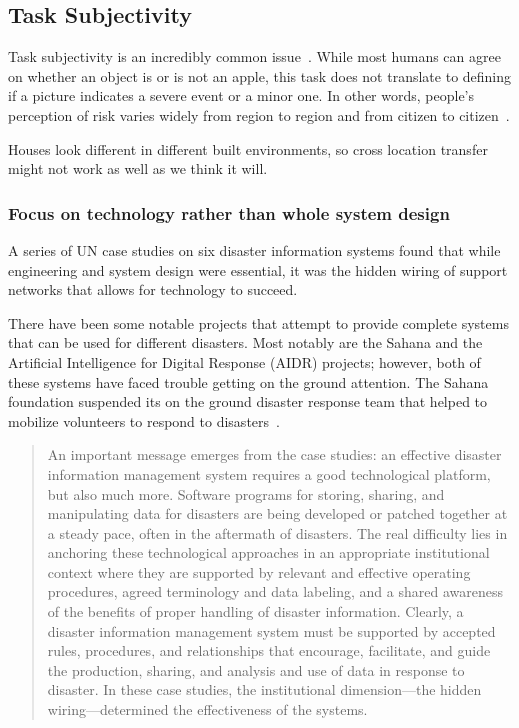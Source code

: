 \subsection{Task Subjectivity}
Task subjectivity is an incredibly common
issue~\cite{nguyenDamageAssessmentSocial2017,
quarantelliUrbanVulnerabilityDisasters2003}. While most humans can agree on
whether an object is or is not an apple, this task does not translate to
defining if a picture indicates a severe event or a minor one. 
In other words, people's perception of risk varies widely from region to region
and from citizen to citizen~\cite{quarantelliUrbanVulnerabilityDisasters2003}.

Houses look different in different built environments, so cross location
transfer might not work as well as we think it will.

\subsubsection{Focus on technology rather than whole system design}
A series of UN case studies on six disaster information systems found that while
engineering and system design were essential, it was the hidden wiring of support
networks that allows for technology to succeed.

There have been some notable projects that attempt to provide complete systems
that can be used for different disasters. Most notably are the Sahana and the
Artificial Intelligence for Digital Response (AIDR) projects; however, 
both of these systems have faced trouble getting on the ground attention.
The Sahana foundation suspended its on the ground disaster response team
that helped to mobilize volunteers to respond to disasters~\cite{SahanaAGM2018}.

\begin{quote}
An important message emerges from the case studies: an effective disaster
information management system requires a good technological platform,
but also much more. Software programs for storing, sharing, and manipulating
data for disasters are being developed or patched together at a steady pace,
often in the aftermath of disasters. The real difficulty lies in anchoring
these technological approaches in an appropriate institutional context where
they are supported by relevant and effective operating procedures, agreed
terminology and data labeling, and a shared awareness of the benefits of proper
handling of disaster information. Clearly, a disaster information management
system must be supported by accepted rules, procedures, and relationships
that encourage, facilitate, and guide the production, sharing, and analysis and
use of data in response to disaster. In these case studies, the institutional
dimension---the hidden wiring---determined the effectiveness of the
systems.~\cite{aminDataNaturalDisasters2008}
\end{quote}